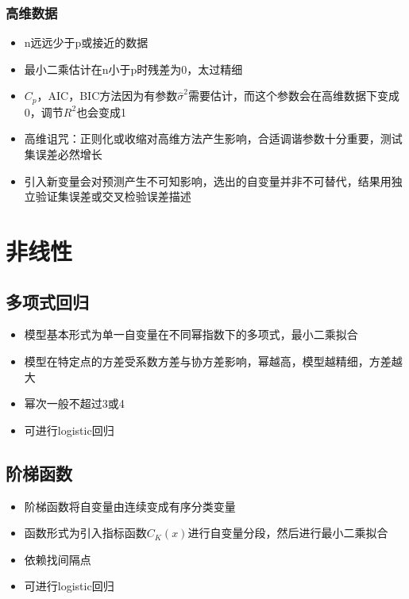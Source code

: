 \documentclass[]{book}
\providecommand{\tightlist}{%
  \setlength{\itemsep}{0pt}\setlength{\parskip}{0pt}}
\begin{document}
\hypertarget{ux9ad8ux7ef4ux6570ux636e}{%
\subsubsection{高维数据}\label{ux9ad8ux7ef4ux6570ux636e}}

\begin{itemize}
\tightlist
\item
  n远远少于p或接近的数据
\item
  最小二乘估计在n小于p时残差为0，太过精细
\item
  \(C_p\)，AIC，BIC方法因为有参数\(\hat \sigma^2\)需要估计，而这个参数会在高维数据下变成0，调节\(R^2\)也会变成1
\item
  高维诅咒：正则化或收缩对高维方法产生影响，合适调谐参数十分重要，测试集误差必然增长
\item
  引入新变量会对预测产生不可知影响，选出的自变量并非不可替代，结果用独立验证集误差或交叉检验误差描述
\end{itemize}

\hypertarget{ux975eux7ebfux6027}{%
\section{非线性}\label{ux975eux7ebfux6027}}

\hypertarget{ux591aux9879ux5f0fux56deux5f52}{%
\subsection{多项式回归}\label{ux591aux9879ux5f0fux56deux5f52}}

\begin{itemize}
\tightlist
\item
  模型基本形式为单一自变量在不同幂指数下的多项式，最小二乘拟合
\item
  模型在特定点的方差受系数方差与协方差影响，幂越高，模型越精细，方差越大
\item
  幂次一般不超过3或4
\item
  可进行logistic回归
\end{itemize}

\hypertarget{ux9636ux68afux51fdux6570}{%
\subsection{阶梯函数}\label{ux9636ux68afux51fdux6570}}

\begin{itemize}
\tightlist
\item
  阶梯函数将自变量由连续变成有序分类变量
\item
  函数形式为引入指标函数\(C_K(x)\)进行自变量分段，然后进行最小二乘拟合
\item
  依赖找间隔点
\item
  可进行logistic回归
\end{itemize}
\end{document}
